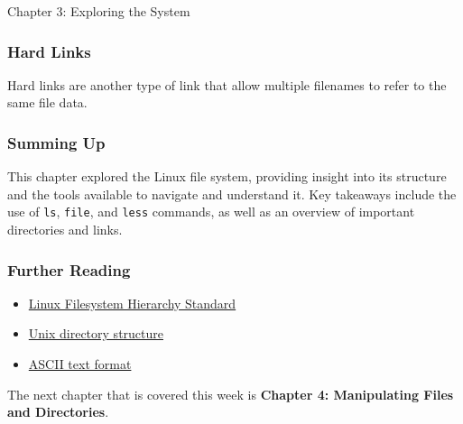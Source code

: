 \begin{notes}{Chapter 3: Exploring the System}
    \subsubsection*{Hard Links}

    Hard links are another type of link that allow multiple filenames to refer to the same file data.

    \subsubsection*{Summing Up}

    This chapter explored the Linux file system, providing insight into its structure and the tools available to navigate and understand it. Key takeaways include the use of \texttt{ls}, \texttt{file}, 
    and \texttt{less} commands, as well as an overview of important directories and links.

    \subsubsection*{Further Reading}

    \begin{itemize}
        \item \href{http://www.pathname.com/fhs/}{Linux Filesystem Hierarchy Standard}
        \item \href{http://en.wikipedia.org/wiki/Unix_directory_structure}{Unix directory structure}
        \item \href{http://en.wikipedia.org/wiki/ASCII}{ASCII text format}
    \end{itemize}
\end{notes}

The next chapter that is covered this week is \textbf{Chapter 4: Manipulating Files and Directories}.

